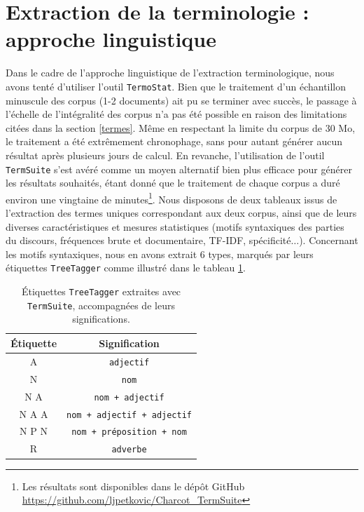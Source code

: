 \section{Extraction de la terminologie : approche linguistique}
\label{sect:termsuite}
Dans le cadre de l'approche linguistique de l'extraction terminologique, nous avons tenté d'utiliser l'outil \texttt{TermoStat}. Bien que le traitement d'un échantillon minuscule des corpus (1-2 documents) ait pu se terminer avec succès, le passage à l'échelle de l'intégralité des corpus n'a pas été possible en raison des limitations citées dans la section \ref{termes}. Même en respectant la limite du corpus de 30 Mo, le traitement a été extrêmement chronophage, sans pour autant générer aucun résultat après plusieurs jours de calcul. En revanche, l'utilisation de l'outil \texttt{TermSuite} s'est avéré comme un moyen alternatif bien plus efficace pour générer les résultats souhaités, étant donné que le traitement de chaque corpus a duré environ une vingtaine de minutes\footnote{Les résultats sont disponibles dans le dépôt GitHub \url{https://github.com/ljpetkovic/Charcot\_TermSuite}}. Nous disposons de deux tableaux issus de l'extraction des termes uniques correspondant aux deux corpus, ainsi que de leurs diverses caractéristiques et mesures statistiques (motifs syntaxiques des parties du discours, fréquences brute et documentaire, \textsc{TF-IDF}, spécificité$\dots$). Concernant les motifs syntaxiques, nous en avons extrait 6 types, marqués par leurs étiquettes \texttt{TreeTagger} comme illustré dans le tableau \ref{tab:POS_tags}. 
\begin{table}[h]
	\centering
	\begin{tabular}{c|c}
		Étiquette & Signification \\\hline
		\textsc{A} & \texttt{adjectif}\\
		\textsc{N} & \texttt{nom}\\ 
		\textsc{N A} & \texttt{nom + adjectif}\\
		\textsc{N A A} & \texttt{nom + adjectif + adjectif}\\
		\textsc{N P N} & \texttt{nom + préposition + nom}\\
		\textsc{R} & \texttt{adverbe}
	\end{tabular}
	\caption{Étiquettes \texttt{TreeTagger} extraites avec \texttt{TermSuite}, accompagnées de leurs significations.}
	\label{tab:POS_tags}
\end{table} 

